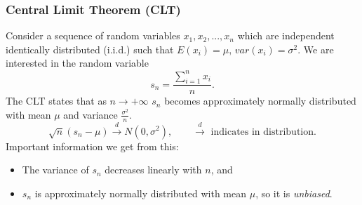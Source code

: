 	\subsubsection{Central Limit Theorem (CLT)}\label{sec:clt}
		Consider a sequence of random variables $x_1,x_2,...,x_n$ which are independent identically distributed (i.i.d.) such that $E(x_i)=\mu,\,var(x_i)=\sigma^2$. We are interested in the random variable
		\begin{equation*}
			s_n=\frac{\sum\limits_{i=1}^n x_i}{n}.
		\end{equation*}
		The CLT states that as $n\rightarrow+\infty$ $s_n$ becomes approximately normally distributed with mean $\mu$ and variance $\frac{\sigma^2}{n}$.
		\begin{equation*}
			\sqrt{n}(s_n-\mu)\xrightarrow{d}N(0,\sigma^2),\qquad \xrightarrow{d}\text{ indicates in distribution.}
		\end{equation*}
		Important information we get from this:
		\begin{itemize}
			\item The variance of $s_n$ decreases linearly with $n$, and
			\item $s_n$ is approximately normally distributed with mean $\mu$, so it is \emph{unbiased}.
		\end{itemize}
